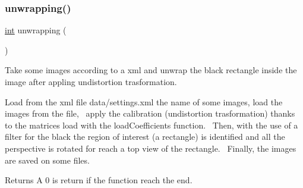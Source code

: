 \subsubsection{\texorpdfstring{unwrapping()}{unwrapping()}}
{\footnotesize\ttfamily \mbox{\hyperlink{draw_8hh_aa620a13339ac3a1177c86edc549fda9b}{int}} unwrapping (\begin{DoxyParamCaption}{ }\end{DoxyParamCaption})}



Take some images according to a xml and unwrap the black rectangle inside the image after appling undistortion trasformation. 

Load from the xml file \textquotesingle{}data/settings.\+xml\textquotesingle{} the name of some images, load the images from the file,~\newline
apply the calibration (undistortion trasformation) thanks to the matrices load with the \textquotesingle{}load\+Coefficients\textquotesingle{} function.~\newline
Then, with the use of a filter for the black the region of interest (a rectangle) is identified and all the perspective is rotated for reach a top view of the rectangle.~\newline
Finally, the images are saved on some files.

\begin{DoxyReturn}{Returns}
A 0 is return if the function reach the end. 
\end{DoxyReturn}
